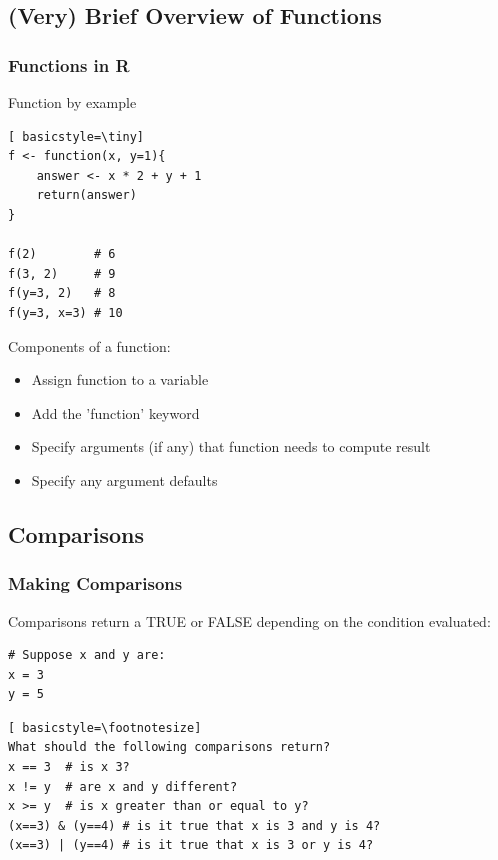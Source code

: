 \subsection{(Very) Brief Overview of Functions}
\begin{frame}[fragile]
	\frametitle{Functions in R}
	\vspace{-15pt}
	\begin{center}
		\begin{block}{Function by example}
			\begin{lstlisting}[ basicstyle=\tiny]
f <- function(x, y=1){
	answer <- x * 2 + y + 1
	return(answer)
}

f(2)        # 6
f(3, 2)     # 9
f(y=3, 2)   # 8
f(y=3, x=3) # 10
			\end{lstlisting}	
		\end{block}

		\vspace{-5pt}
		\begin{block}{Components of a function:}
			\begin{itemize}
				\item Assign function to a variable
				\item Add the 'function' keyword
				\item Specify arguments (if any) that function needs to compute result
				\item Specify any argument defaults
			\end{itemize}
		\end{block}
	\end{center} 
\end{frame}

\subsection{Comparisons}
\begin{frame}[fragile]
\frametitle{Making Comparisons}
Comparisons return a TRUE or FALSE depending on the condition evaluated:
			\begin{lstlisting}
# Suppose x and y are:
x = 3
y = 5
			\end{lstlisting}
			\begin{lstlisting}[ basicstyle=\footnotesize]
What should the following comparisons return?
x == 3  # is x 3?
x != y  # are x and y different?
x >= y  # is x greater than or equal to y?
(x==3) & (y==4) # is it true that x is 3 and y is 4?
(x==3) | (y==4) # is it true that x is 3 or y is 4?
			\end{lstlisting}	
\end{frame}

